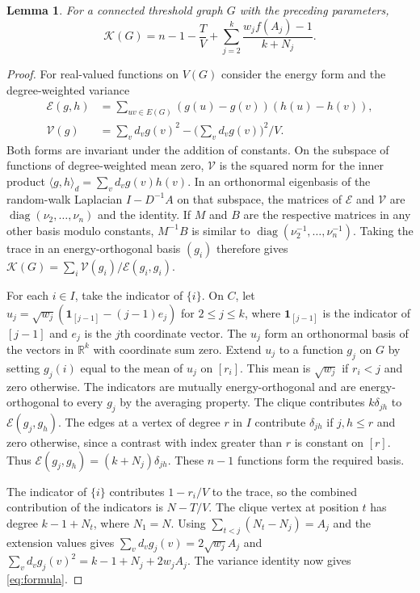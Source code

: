 \documentclass[11pt]{amsart}
\newtheorem{lemma}[theorem]{Lemma}
\numberwithin{equation}{section}
\newcommand{\K}{\mathcal K}
\newcommand{\one}{\mathbf 1}
\newcommand{\E}{\mathcal E}
\begin{document}
\begin{lemma}\label{lem:spectral}
For a connected threshold graph $G$ with the preceding parameters,
\begin{equation}\label{eq:formula}
 \K(G)=n-1-\frac TV+
 \sum_{j=2}^k\frac{w_j f(A_j)-1}{k+N_j}.
\end{equation}
\end{lemma}
\begin{proof}
For real-valued functions on $V(G)$ consider the energy form and
the degree-weighted variance
\begin{align*}
 \E(g,h)&=\sum_{uv\in E(G)}(g(u)-g(v))(h(u)-h(v)),\\
 \mathcal V(g)&=\sum_v d_vg(v)^2-\biggl(\sum_v d_v g(v)\biggr)^2/V .
\end{align*}
Both forms are invariant under the addition of constants. On the
subspace of functions of degree-weighted mean zero, $\mathcal V$ is
the squared norm for the inner product
$\langle g,h\rangle_d=\sum_v d_vg(v)h(v)$. In an orthonormal
eigenbasis of the random-walk Laplacian $I-D^{-1}A$ on that subspace,
the matrices of $\E$ and $\mathcal V$ are
$\operatorname{diag}(\nu_2,\ldots,\nu_n)$ and the identity.
If $M$ and $B$ are the respective matrices in any other basis modulo
constants, $M^{-1}B$ is similar to
$\operatorname{diag}(\nu_2^{-1},\ldots,\nu_n^{-1})$. Taking the trace in an
energy-orthogonal basis $(g_i)$ therefore gives
$\K(G)=\sum_i\mathcal V(g_i)/\E(g_i,g_i)$.

For each $i\in I$, take the indicator of $\{i\}$. On $C$, let
$u_j=\sqrt{w_j}(\one_{[j-1]}-(j-1)e_j)$ for $2\le j\le k$, where
$\one_{[j-1]}$ is the indicator of $[j-1]$ and $e_j$ is the $j$th
coordinate vector. The $u_j$ form an orthonormal basis of the vectors
in $\mathbb R^k$ with coordinate sum zero. Extend $u_j$ to a function
$g_j$ on $G$ by setting $g_j(i)$ equal to the mean of $u_j$ on
$[r_i]$. This mean is $\sqrt{w_j}$ if $r_i<j$ and zero otherwise.
The indicators are mutually energy-orthogonal and are energy-orthogonal
to every $g_j$ by the averaging property. The clique
contributes $k\delta_{jh}$ to $\E(g_j,g_h)$. The edges at a vertex
of degree $r$ in $I$ contribute $\delta_{jh}$ if $j,h\le r$ and
zero otherwise, since a contrast with index greater than $r$ is
constant on $[r]$. Thus $\E(g_j,g_h)=(k+N_j)\delta_{jh}$. These
$n-1$ functions form the required basis.

The indicator of $\{i\}$ contributes $1-r_i/V$ to the trace,
so the combined contribution of the indicators is $N-T/V$. The clique
vertex at position $t$ has degree $k-1+N_t$, where $N_1=N$. Using
$\sum_{t<j}(N_t-N_j)=A_j$ and the extension values gives
$\sum_v d_vg_j(v)=2\sqrt{w_j}A_j$ and
$\sum_v d_vg_j(v)^2=k-1+N_j+2w_jA_j$. The variance identity
now gives \eqref{eq:formula}.
\end{proof}
\end{document}
